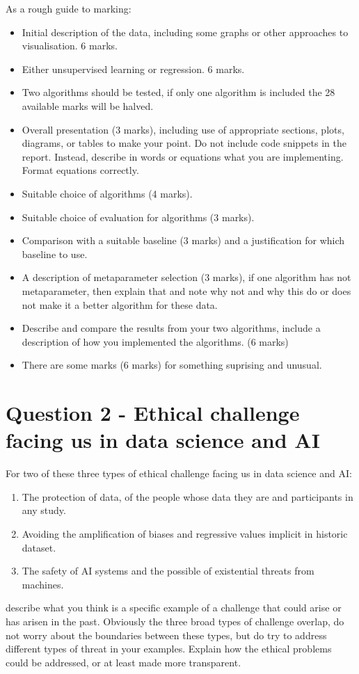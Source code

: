 \documentclass[12pt]{article}
\begin{document}
As a rough guide to marking:
\begin{itemize}
\item Initial description of the data, including some graphs or other approaches to visualisation. 6 marks.
\item Either unsupervised learning or regression. 6 marks.
\item Two algorithms should be tested, if only one algorithm is
  included the 28 available marks will be halved.
\item Overall presentation (3 marks), including use of appropriate
  sections, plots, diagrams, or tables to make your point. Do not
  include code snippets in the report. Instead, describe in words or
  equations what you are implementing. Format equations correctly.
\item Suitable choice of algorithms (4 marks).
\item Suitable choice of evaluation for algorithms (3 marks).
\item Comparison with a suitable baseline (3 marks) and a justification for which baseline to use.
\item A description of metaparameter selection (3 marks), if one
  algorithm has not metaparameter, then explain that and note why not
  and why this do or does not make it a better algorithm for these
  data.
\item Describe and compare the results from your two algorithms,
  include a description of how you implemented the algorithms. (6 marks)
\item There are some marks (6 marks) for something suprising and unusual.
\end{itemize}

\printbibliography


\section*{Question 2 - Ethical challenge facing us in data science and AI}

For two of these three types of ethical challenge facing us in data science and AI:
\begin{enumerate}
\item The protection of data, of the people whose data they are and participants in any study.
\item Avoiding the amplification of biases and regressive values implicit in historic dataset.
\item The safety of AI systems and the possible of existential threats from machines.
\end{enumerate}
describe what you think is a specific example of a challenge that
could arise or has arisen in the past. Obviously the three broad types
of challenge overlap, do not worry about the boundaries between these
types, but do try to address different types of threat in your
examples. Explain how the ethical problems could be addressed, or at
least made more transparent.
\end{document}
